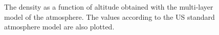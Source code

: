 \documentclass[twocolumn]{article}
\begin{document}
\begin{large}
\begin{figure}[!t]
\begin{center}
    \end{center}
    \caption{The density as a function of altitude obtained with the multi-layer model of the atmosphere. The values according to the US standard atmosphere model are also plotted.}
    \label{9maj2054}
\end{figure}




























\end{large}
\end{document}
